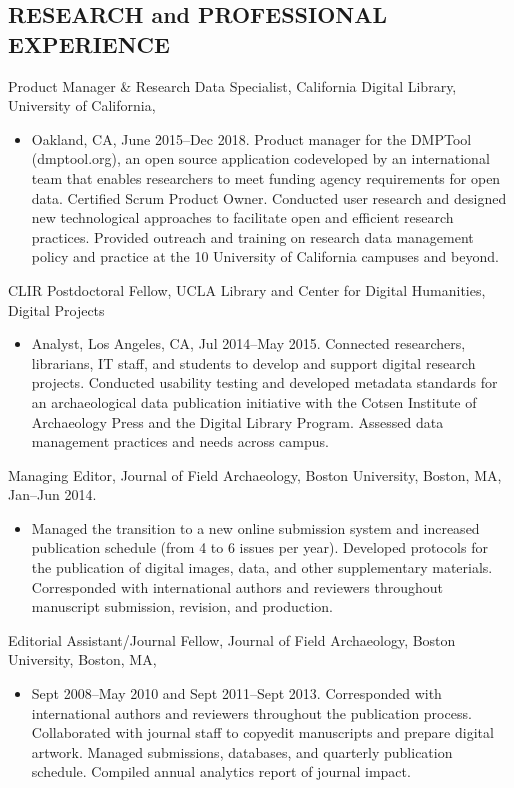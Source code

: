 \documentclass[10pt,centered]{res} %
\begin{document}
\begin{resume}
\section{\color{ResumeBlue}RESEARCH and PROFESSIONAL EXPERIENCE}
Product Manager \& Research Data Specialist, California Digital Library, University of California,
\begin{itemize}
\item[]Oakland, CA, June 2015--Dec 2018. Product manager for the DMPTool (dmptool.org), an open source application codeveloped by an international team that enables researchers to meet funding agency requirements for open data. Certified Scrum Product Owner. Conducted user research and designed new technological approaches to facilitate open and efficient research practices. Provided outreach and training on research data management policy and practice at the 10 University of California campuses and beyond.
\end{itemize}
\vspace*{-1em}
CLIR Postdoctoral Fellow, UCLA Library and Center for Digital Humanities, Digital Projects
\begin{itemize}
\item[]Analyst, Los Angeles, CA, Jul 2014--May 2015. Connected researchers, librarians, IT staff, and students to develop and support digital research projects. Conducted usability testing and developed metadata standards for an archaeological data publication initiative with the Cotsen Institute of Archaeology Press and the Digital Library Program. Assessed data management practices and needs across campus.
\end{itemize}
\vspace*{-1em}
Managing Editor, Journal of Field Archaeology, Boston University, Boston, MA, Jan--Jun 2014.
\begin{itemize}
 \item[]Managed the transition to a new online submission system and increased publication schedule (from 4 to 6 issues per year).  Developed protocols for the publication of digital images, data, and other supplementary materials. Corresponded with international authors and reviewers throughout manuscript submission, revision, and production.
 \end{itemize}
\vspace*{-1em}
Editorial Assistant/Journal Fellow, Journal of Field Archaeology, Boston University, Boston, MA,
\begin{itemize}
 \item[]Sept 2008--May 2010 and Sept 2011--Sept 2013. Corresponded with international authors and reviewers throughout the publication process. Collaborated with journal staff to copyedit manuscripts and prepare digital artwork. Managed submissions, databases, and quarterly publication schedule. Compiled annual analytics report of journal impact.

\end{itemize}
\end{resume}
\end{document}
